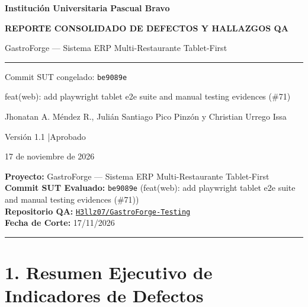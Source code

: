 \documentclass[10pt,a4paper]{article}
\begin{document}
\begin{titlepage}
\thispagestyle{empty}
\centering
\vspace*{1.2cm}
{\large\bfseries Institución Universitaria Pascual Bravo\par}
\vspace{1.2cm}
{\Huge\bfseries\color{gfaccent} REPORTE CONSOLIDADO DE DEFECTOS Y HALLAZGOS QA\par}
\vspace{0.6cm}
{\Large GastroForge --- Sistema ERP Multi-Restaurante Tablet-First\par}
\vspace{1.0cm}
\rule{0.6\linewidth}{0.6pt}\par
\vspace{0.8cm}
{\large Commit SUT congelado: \texttt{be9089e}\par}
{\normalsize feat(web): add playwright tablet e2e suite and manual testing evidences (\#71)\par}
\vspace{0.8cm}
{\large Jhonatan A. Méndez R., Julián Santiago Pico Pinzón y Christian Urrego Issa\par}
\vspace{0.6cm}
{\normalsize Versión 1.1 \quad|\quad Aprobado\par}
{\normalsize 17 de noviembre de 2026\par}
\end{titlepage}
\pagestyle{fancy}
{\hypersetup{linkcolor=black}
\renewcommand{\contentsname}{Contenido}
\tableofcontents}
\clearpage

\textbf{Proyecto:} GastroForge --- Sistema ERP Multi-Restaurante Tablet-First\\
\textbf{Commit SUT Evaluado:} \texttt{be9089e} (feat(web): add playwright tablet e2e suite and manual testing evidences (\#71))\\
\textbf{Repositorio QA:} \href{https://github.com/H3llz07/GastroForge-Testing}{\texttt{H3llz07/\allowbreak{}GastroForge-{}\allowbreak{}Testing}}\\
\textbf{Fecha de Corte:} 17/11/2026

\begin{center}\rule{0.5\linewidth}{0.5pt}\end{center}


\section{1. Resumen Ejecutivo de Indicadores de Defectos}\label{1-resumen-ejecutivo-de-indicadores-de-defectos}
\end{document}
